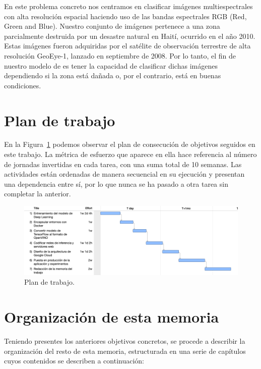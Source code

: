 En este problema concreto nos centramos en clasificar imágenes multiespectrales con alta resolución espacial \cite{imageProcessing} haciendo uso de las bandas espectrales RGB (Red, Green and Blue).
Nuestro conjunto de imágenes pertenece a una zona parcialmente destruida por un desastre natural en Haití, ocurrido en el año 2010.
Estas imágenes fueron adquiridas por el satélite de observación terrestre de alta resolución GeoEye-1, lanzado en septiembre de 2008.
Por lo tanto, el fin de nuestro modelo de  es tener la capacidad de clasificar dichas imágenes dependiendo si la zona está dañada o, por el contrario, está en buenas condiciones.

\section{Plan de trabajo}\label{sec:plan-de-trabajo}
En la Figura~\ref{fig:Plan_de_trabajo} podemos observar el plan de consecución de objetivos seguidos en este trabajo.
La métrica de esfuerzo que aparece en ella hace referencia al número de jornadas invertidas en cada tarea, con una suma total de 10 semanas.
Las actividades están ordenadas de manera secuencial en su ejecución y presentan una dependencia entre sí, por lo que nunca se ha
pasado a otra tarea sin completar la anterior.

\begin{figure}[H]
    \centering
    \includegraphics[width=1\textwidth]{images/chapter1/work_plan.png}
    \caption{Plan de trabajo.}
    \label{fig:Plan_de_trabajo}
\end{figure}

\section{Organización de esta memoria}\label{sec:organización-de-esta-memoria}

Teniendo presentes los anteriores objetivos concretos, se procede a describir la organización del resto de esta memoria, estructurada en una serie de capítulos cuyos contenidos se
describen a continuación:

